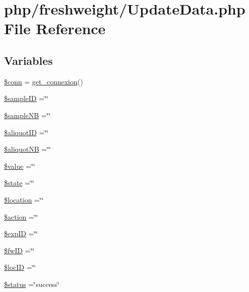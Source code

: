 \hypertarget{_update_data_8php}{\section{php/freshweight/\-Update\-Data.php File Reference}
\label{_update_data_8php}
}
\subsection*{Variables}
\begin{DoxyCompactItemize}
\item 
\hyperlink{_update_data_8php_aa8a5a87b9c1a6a0819b88447cbe41877}{\$conn} = \hyperlink{php__functions_8php_ace18bc10f3fd08f92688ac743e0d8c2e}{get\-\_\-connexion}()
\item 
\hyperlink{_update_data_8php_a02ac215b001606467b9148c4cd0583f1}{\$sample\-I\-D} =\char`\"{}\char`\"{}
\item 
\hyperlink{_update_data_8php_af4527e3b791f29528cf4587debf433df}{\$sample\-N\-B} =\char`\"{}\char`\"{}
\item 
\hyperlink{_update_data_8php_a54b5731b97b1351783471e68775046b5}{\$aliquot\-I\-D} =\char`\"{}\char`\"{}
\item 
\hyperlink{_update_data_8php_a1544720fdad7b397bd59e591e83a2d3c}{\$aliquot\-N\-B} =\char`\"{}\char`\"{}
\item 
\hyperlink{_update_data_8php_a0f298096f322952a72a50f98a74c7b60}{\$value} =\char`\"{}\char`\"{}
\item 
\hyperlink{_update_data_8php_ae82306c4f2d17d8dd5c7d8d916b33bed}{\$state} =\char`\"{}\char`\"{}
\item 
\hyperlink{_update_data_8php_ac319193077976bb217112e5a7b7b8022}{\$location} =\char`\"{}\char`\"{}
\item 
\hyperlink{_update_data_8php_aa698a3e72116e8e778be0e95d908ee30}{\$action} =\char`\"{}\char`\"{}
\item 
\hyperlink{_update_data_8php_ae384d32e62e85e587cd27bf249ed3db3}{\$exp\-I\-D} =\char`\"{}\char`\"{}
\item 
\hyperlink{_update_data_8php_a7bb49988a552894a7bd314eaff592cb1}{\$fw\-I\-D} =\char`\"{}\char`\"{}
\item 
\hyperlink{_update_data_8php_a300bbb59b771f6b6700da34d749d93e7}{\$loc\-I\-D} =\char`\"{}\char`\"{}
\item 
\hyperlink{_update_data_8php_a58391ea75f2d29d5d708d7050b641c33}{\$status} =\char`\"{}success\char`\"{}
\item 

\end{DoxyCompactItemize}
